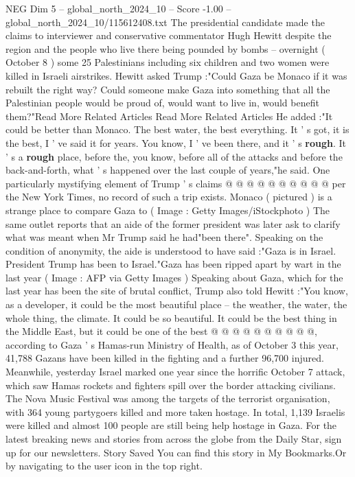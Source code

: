 \begin{textsample}{NEG Dim 5 – global\_north\_2024\_10 – Score -1.00 – global\_north\_2024\_10/115612408.txt}  \label{ex:f5_neg_051}
The presidential candidate made the claims to interviewer and conservative commentator Hugh Hewitt despite the region and the people who live there being pounded by bombs -- overnight ( October 8 ) some 25 Palestinians including six children and two women were killed in Israeli airstrikes.
Hewitt asked Trump :"Could Gaza be Monaco if it was rebuilt the right way?
Could someone make Gaza into something that all the Palestinian people would be proud of, would want to live in, would benefit them?"Read More Related Articles Read More Related Articles He added :"It could be better than Monaco.
The best water, the best everything.
It ' s got, it is the best, I ' ve said it for years.
You know, I ' ve been there, and it ' s \textbf{rough}.
It ' s a \textbf{rough} place, before the, you know, before all of the attacks and before the back-and-forth, what ' s happened over the last couple of years,"he said.
One particularly mystifying element of Trump ' s claims @ @ @ @ @ @ @ @ @ @ per the New York Times, no record of such a trip exists.
Monaco ( pictured ) is a strange place to compare Gaza to ( Image : Getty Images/iStockphoto ) The same outlet reports that an aide of the former president was later ask to clarify what was meant when Mr Trump said he had"been there".
Speaking on the condition of anonymity, the aide is understood to have said :"Gaza is in Israel.
President Trump has been to Israel."Gaza has been ripped apart by wart in the last year ( Image : AFP via Getty Images ) Speaking about Gaza, which for the last year has been the site of brutal conflict, Trump also told Hewitt :"You know, as a developer, it could be the most beautiful place -- the weather, the water, the whole thing, the climate.
It could be so beautiful.
It could be the best thing in the Middle East, but it could be one of the best @ @ @ @ @ @ @ @ @ @, according to Gaza ' s Hamas-run Ministry of Health, as of October 3 this year, 41,788 Gazans have been killed in the fighting and a further 96,700 injured.
Meanwhile, yesterday Israel marked one year since the horrific October 7 attack, which saw Hamas rockets and fighters spill over the border attacking civilians.
The Nova Music Festival was among the targets of the terrorist organisation, with 364 young partygoers killed and more taken hostage.
In total, 1,139 Israelis were killed and almost 100 people are still being help hostage in Gaza.
For the latest breaking news and stories from across the globe from the Daily Star, sign up for our newsletters.
Story Saved You can find this story in My Bookmarks.Or by navigating to the user icon in the top right.

\end{textsample}
